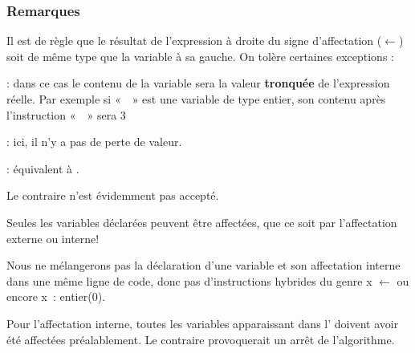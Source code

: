			
			\subsubsection*{Remarques}

			\begin{liste}
			\item
				Il est de règle que le résultat de l’expression à droite du signe
				d’affectation ($\gets$) soit de
				même type que la variable à sa gauche. On tolère certaines exceptions
				:
				\begin{liste}
				\item
					 : 
					dans ce cas le contenu de la variable sera la valeur \textbf{tronquée}
					de l’expression réelle. 
					Par exemple si «~~» est
					une variable de type entier, son contenu après l’instruction
					«~~» 
					sera 3
				\item 
					 :
					ici, il n'y a pas de perte de valeur.
				\item 
					 : 
					équivalent à .
					
					Le contraire n'est évidemment pas accepté.
				\end{liste}
			\item 
				Seules les variables déclarées peuvent être affectées, que ce soit par
				l’affectation externe ou interne!
			\item 
				Nous ne mélangerons pas la déclaration d’une variable et son
				affectation interne dans une même ligne de code, donc pas
				d’instructions hybrides du genre 
				\textsf{x}{ $\gets$ } ou encore 
				\textsf{x~: entier(0)}.
			\item 
				Pour l’affectation interne, toutes les variables apparaissant dans
				l' doivent avoir été affectées
				préalablement. Le contraire provoquerait un arrêt de l’algorithme.
			\end{liste}
			
